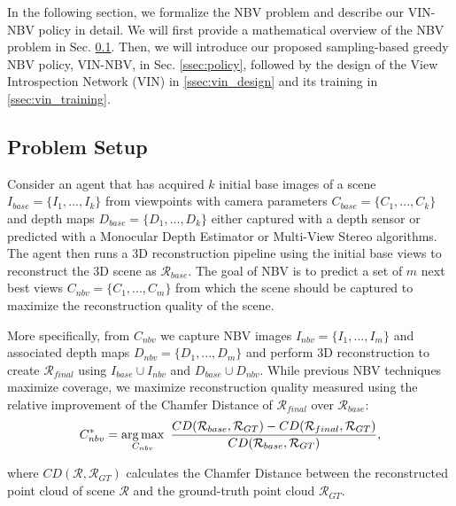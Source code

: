 In the following section, we formalize the NBV problem and describe our VIN-NBV policy in detail.
We will first provide a mathematical overview of the NBV problem in Sec. \ref{ssec:prob}. Then, we will introduce our proposed sampling-based greedy NBV policy, VIN-NBV, in Sec. \ref{ssec:policy}, followed by the design of the View Introspection Network (VIN)  in \ref{ssec:vin_design} and its training in \ref{ssec:vin_training}.

\subsection{Problem Setup}
\label{ssec:prob}
\vspace{-0.25em}

Consider an agent that has acquired $k$ initial base images of a scene $I_{base}=\{I_{1},...,I_{k}\}$ from viewpoints with camera parameters $C_{base}=\{C_{1},...,C_{k}\}$ and depth maps $D_{base}=\{D_{1},...,D_{k}\}$ either captured with a depth sensor or predicted with a Monocular Depth Estimator or Multi-View Stereo algorithms. The agent then runs a 3D reconstruction pipeline using the initial base views to reconstruct the 3D scene as $\mathcal{R}_{base}$. The goal of NBV is to predict a set of $m$ next best views $C_{nbv}=\{C_{{1}},...,C_{m}\}$ from which the scene should be captured to maximize the reconstruction quality of the scene. 

More specifically, from $C_{nbv}$ we capture NBV images $I_{nbv}=\{I_{1},...,I_{m}\}$ and associated depth maps $D_{nbv}=\{D_{1},...,D_{m}\}$ and perform 3D reconstruction to create $\mathcal{R}_{final}$ using $I_{base} \cup I_{nbv}$ and $D_{base} \cup D_{nbv}$. While previous NBV techniques maximize coverage, we maximize reconstruction quality measured using the relative improvement of the Chamfer Distance of $\mathcal{R}_{final}$ over $\mathcal{R}_{base}$:
\begin{equation}
     C^{*}_{nbv} = \operatorname*{arg\,max}_{C_{nbv}} ~\frac{CD(\mathcal{R}_{base},\mathcal{R}_{GT}) -CD(\mathcal{R}_{final},\mathcal{R}_{GT})}{CD(\mathcal{R}_{base},\mathcal{R}_{GT})},     
    \label{eq:cd-criteria}
\end{equation}

where $CD(\mathcal{R},\mathcal{R}_{GT})$ calculates the Chamfer Distance between the reconstructed point cloud of scene $\mathcal{R}$ and the ground-truth point cloud $\mathcal{R}_{GT}$.


